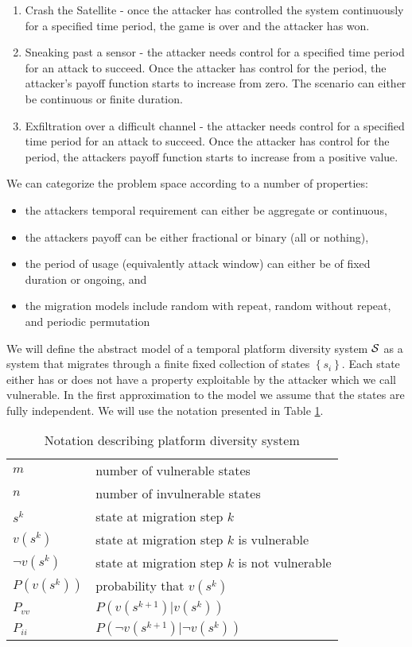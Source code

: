 \documentclass{acm_proc_article-sp}
\providecommand{\tabularnewline}{\\}
\begin{document}
\begin{enumerate}
\item Crash the Satellite - once the attacker has controlled the system
continuously for a specified time period, the game is over and the
attacker has won.
\item Sneaking past a sensor - the attacker needs control for a specified
time period for an attack to succeed. Once the attacker has control
for the period, the attacker's payoff function starts to increase from
zero. The scenario can either be continuous or finite duration.
\item Exfiltration over a difficult channel - the attacker needs control
for a specified time period for an attack to succeed. Once the attacker
has control for the period, the attackers payoff function starts to
increase from a positive value.
\end{enumerate}
We can categorize the problem space according to a number of properties:
\begin{itemize}
\item the attackers temporal requirement can either be aggregate or continuous,
\item the attackers payoff can be either fractional or binary (all or nothing),
\item the period of usage (equivalently attack window) can either be of fixed
duration or ongoing, and
\item the migration models include random with repeat, random without repeat,
and periodic permutation
\end{itemize}
We will define the abstract model of a temporal platform diversity
system ${\cal S}$ as a system that migrates through a finite fixed collection
of states $\left\{ s_{i}\right\}$. Each state either has or does
not have a property exploitable by the attacker which we call vulnerable. In the first approximation to the model we assume that the states are fully independent. We will use the notation presented in Table \ref{table:notation}.

\begin{table}[t]
\begin{tabular}{|l|l|}
\hline 
$m$  & number of vulnerable states\tabularnewline
$n$  & number of invulnerable states \tabularnewline
$s^{k}$ & state at migration step $k$\tabularnewline
$v\left(s^{k}\right)$ & state at migration step $k$ is vulnerable\tabularnewline
$\neg v\left(s^{k}\right)$ & state at migration step $k$ is not vulnerable\tabularnewline
$P\left(v\left(s^{k}\right)\right)$ & probability that $v\left(s^{k}\right)$\tabularnewline
$P_{vv}$ & $P\left(v\left(s^{k+1}\right)|v\left(s^{k}\right)\right)$ \tabularnewline
$P_{ii}$ & $P\left(\neg v\left(s^{k+1}\right)|\neg v\left(s^{k}\right)\right)$\tabularnewline
\hline 
\end{tabular}
\caption{Notation describing platform diversity system}
\label{table:notation}
\end{table}
\end{document}
